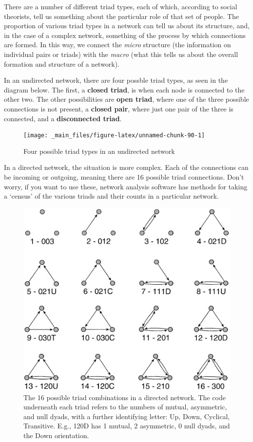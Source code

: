 \documentclass[
]{book}
\begin{document}
There are a number of different triad types, each of which, according to social theorists, tell us something about the particular role of that set of people. The proportion of various triad types in a network can tell us about its structure, and, in the case of a complex network, something of the process by which connections are formed. In this way, we connect the \emph{micro} structure (the information on individual pairs or triads) with the \emph{macro} (what this tells us about the overall formation and structure of a network).

In an undirected network, there are four possble triad types, as seen in the diagram below. The first, a \textbf{closed triad}, is when each node is connected to the other two. The other possibilities are \textbf{open triad}, where one of the three possible connections is not present, a \textbf{closed pair}, where just one pair of the three is connected, and a \textbf{disconnected triad}.

\begin{figure}

{\centering \texttt{[image: \_main\_files/figure-latex/unnamed-chunk-90-1]} 

}

\caption{Four possible triad types in an undirected network}\label{fig:unnamed-chunk-90}
\end{figure}

In a directed network, the situation is more complex. Each of the connections can be incoming or outgoing, meaning there are 16 possible triad connections. Don't worry, if you want to use these, network analysis software has methods for taking a `census' of the various triads and their counts in a particular network.

\begin{figure}
\centering
\includegraphics{images/triad_census.jpg}
\caption{The 16 possible triad combinations in a directed network. The code underneath each triad refers to the numbers of mutual, asymmetric, and null dyads, with a further identifying letter: Up, Down, Cyclical, Transitive. E.g., 120D has 1 mutual, 2 asymmetric, 0 null dyads, and the Down orientation.}
\end{figure}
\end{document}
